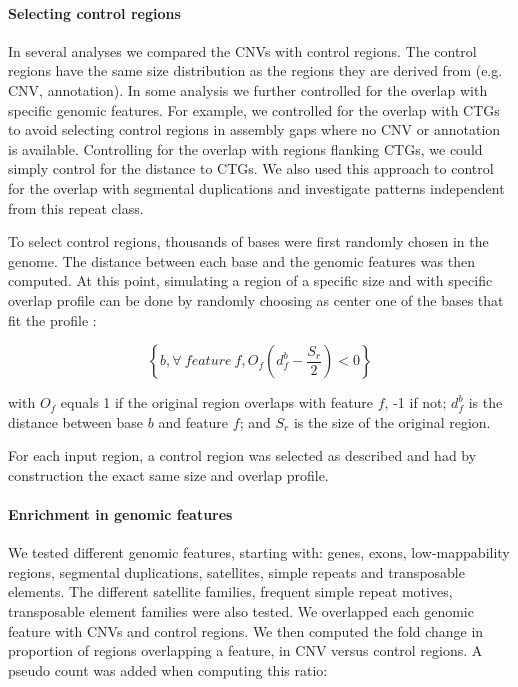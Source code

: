 \paragraph{Selecting control regions}
\label{sec:controlreg}
In several analyses we compared the CNVs with control regions.
The control regions have the same size distribution as the regions they are derived from (e.g. CNV, annotation).
In some analysis we further controlled for the overlap with specific genomic features.
For example, we controlled for the overlap with CTGs to avoid selecting control regions in assembly gaps where no CNV or annotation is available.
Controlling for the overlap with regions flanking CTGs, we could simply control for the distance to CTGs.
We also used this approach to control for the overlap with segmental duplications and investigate patterns independent from this repeat class.

To select control regions, thousands of bases were first randomly chosen in the genome.
The distance between each base and the genomic features was then computed.
At this point, simulating a region of a specific size and with specific overlap profile can be done by randomly choosing as center one of the bases that fit the profile :

\begin{equation}
  \label{eq:controlreg}
  \left\{b,  \forall~feature~f, O_f(d_f^b - \frac{S_r}{2}) < 0\right\}  
\end{equation}

\noindent with $O_f$ equals 1 if the original region overlaps with feature $f$, -1 if not; $d_f^b$ is the distance between base $b$ and feature $f$; and $S_r$ is the size of the original region.

For each input region, a control region was selected as described and had by construction the exact same size and overlap profile.

\paragraph{Enrichment in genomic features}
We tested different genomic features, starting with: genes, exons, low-mappability regions, segmental duplications, satellites, simple repeats and transposable elements.
The different satellite families, frequent simple repeat motives, transposable element families were also tested.
We overlapped each genomic feature with CNVs and control regions.
We then computed the fold change in proportion of regions overlapping a feature, in CNV versus control regions.
A pseudo count was added when computing this ratio:

